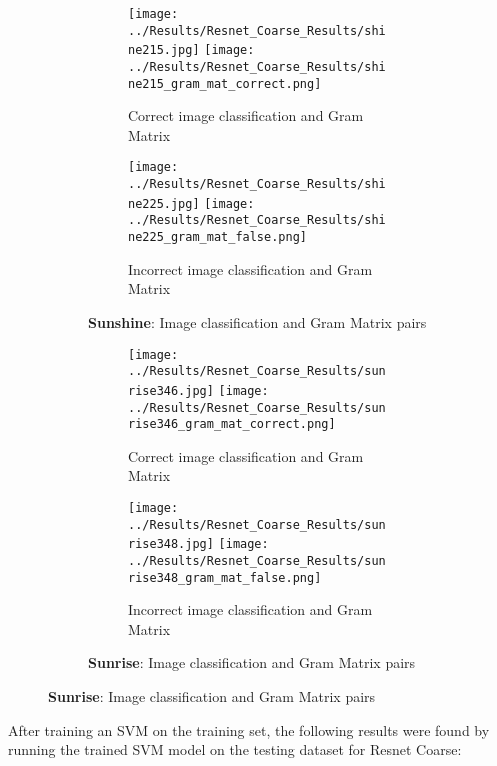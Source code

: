 \documentclass{article}
\begin{document}
\begin{figure}[H]
    \begin{subfigure}{\linewidth}
        \centering
        \begin{subfigure}{0.49\linewidth}
            \centering
            \texttt{[image: ../Results/Resnet\_Coarse\_Results/shine215.jpg]}
            \texttt{[image: ../Results/Resnet\_Coarse\_Results/shine215\_gram\_mat\_correct.png]}
            \caption*{Correct image classification and Gram Matrix}
        \end{subfigure}
        \begin{subfigure}{0.49\linewidth}
            \centering
            \texttt{[image: ../Results/Resnet\_Coarse\_Results/shine225.jpg]}
            \texttt{[image: ../Results/Resnet\_Coarse\_Results/shine225\_gram\_mat\_false.png]}
            \caption*{Incorrect image classification and Gram Matrix}
        \end{subfigure}
        \caption*{\textbf{Sunshine}: Image classification and Gram Matrix pairs}
    \end{subfigure}
    \hfill

    \begin{subfigure}{\linewidth}
        \centering
        \begin{subfigure}{0.49\linewidth}
            \centering
            \texttt{[image: ../Results/Resnet\_Coarse\_Results/sunrise346.jpg]}
            \texttt{[image: ../Results/Resnet\_Coarse\_Results/sunrise346\_gram\_mat\_correct.png]}
            \caption*{Correct image classification and Gram Matrix}
        \end{subfigure}
        \begin{subfigure}{0.49\linewidth}
            \centering
            \texttt{[image: ../Results/Resnet\_Coarse\_Results/sunrise348.jpg]}
            \texttt{[image: ../Results/Resnet\_Coarse\_Results/sunrise348\_gram\_mat\_false.png]}
            \caption*{Incorrect image classification and Gram Matrix}
        \end{subfigure}
        \caption*{\textbf{Sunrise}: Image classification and Gram Matrix pairs}
    \end{subfigure}
\end{figure}

After training an SVM on the training set, the following results were found by running the trained SVM model on the testing dataset for Resnet Coarse:
\end{document}
